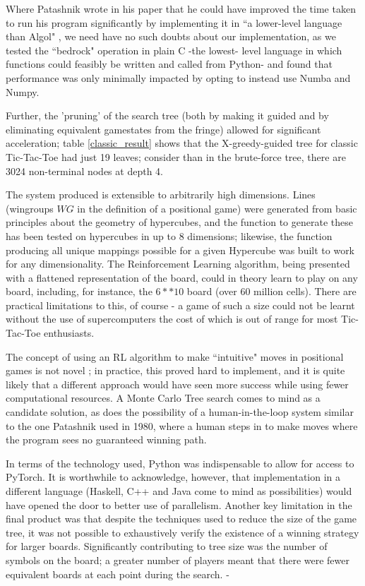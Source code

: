 \documentclass[12pt,a4paper]{article}
\begin{document}
Where Patashnik wrote in his paper that he could have improved the time taken to run his program significantly by implementing it in ``a lower-level language than Algol" \cite{patashnik1980qubic}, we need have no such doubts about our implementation, as we tested the ``bedrock" operation in plain C -the lowest- level language in which functions could feasibly be written and called from Python- and found that performance was only minimally impacted by opting to instead use Numba and Numpy.

Further, the 'pruning' of the search tree (both by making it guided and by eliminating equivalent gamestates from the fringe) allowed for significant acceleration; table \ref{classic_result} shows that the X-greedy-guided tree for classic Tic-Tac-Toe had just 19 leaves; consider than in the brute-force tree, there are 3024 non-terminal nodes at depth 4. 

The system produced is extensible to arbitrarily high dimensions. Lines (wingroups $WG$ in the definition of a positional game) were generated from basic principles about the geometry of hypercubes, and the function to generate these has been tested on hypercubes in up to 8 dimensions; likewise, the function producing all unique mappings possible for a given Hypercube was built to work for any dimensionality. The Reinforcement Learning algorithm, being presented with a flattened representation of the board, could in theory learn to play on any board, including, for instance, the $6**10$ board (over 60 million cells). There are practical limitations to this, of course - a game of such a size could not be learnt without the use of supercomputers the cost of which is out of range for most Tic-Tac-Toe enthusiasts.

The concept of using an RL algorithm to make ``intuitive" moves in positional games is not novel \cite{mozur_2017}; in practice, this proved hard to implement, and it is quite likely that a different approach would have seen more success while using fewer computational resources. A Monte Carlo Tree search comes to mind as a candidate solution, as does the possibility of a human-in-the-loop system similar to the one Patashnik used in 1980, where a human steps in to make moves where the program sees no guaranteed winning path.

In terms of the technology used, Python was indispensable to allow for access to PyTorch. It is worthwhile to acknowledge, however, that implementation in a different language (Haskell, C++ and Java come to mind as possibilities) would have opened the door to better use of parallelism. Another key limitation in the final product was that despite the techniques used to reduce the size of the game tree, it was not possible to exhaustively verify the existence of a winning strategy for larger boards. Significantly contributing to tree size was the number of symbols on the board; a greater number of players meant that there were fewer equivalent boards at each point during the search.
- 
\end{document}
